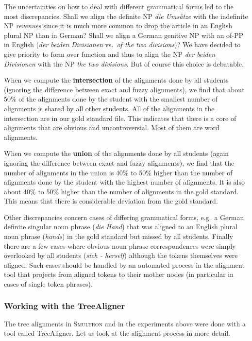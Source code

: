 \documentclass[output=paper]{LSP/langsci}
\begin{document}
The uncertainties on how to deal with different grammatical forms led to the most discrepancies. Shall we align the definite NP \textit{die Umsätze }with the indefinite NP \textit{revenues }since it is much more common to drop the article in an English plural NP than in German? Shall we align a German genitive NP with an of-PP in English (\textit{der beiden }\textit{Divisionen }vs.~\textit{of the two divisions})? We have decided to give priority to form over function and thus to align the NP \textit{der beiden Divisionen }with the NP \textit{the two divisions}. But of course this choice is debatable. 

When we compute the \textbf{intersection }of the alignments done by all students (ignoring the difference between exact and fuzzy alignments), we find that about 50\% of the alignments done by the student with the smallest number of alignments is shared by all other students. All of the alignments in the intersection are in our gold standard file. This indicates that there is a core of alignments that are obvious and uncontroversial. Most of them are word alignments. 

When we compute the \textbf{union }of the alignments done by all students (again ignoring the difference between exact and fuzzy alignments), we find that the number of alignments in the union is 40\% to 50\% higher than the number of alignments done by the student with the highest number of alignments. It is also about 40\% to 50\% higher than the number of alignments in the gold standard. This means that there is considerable deviation from the gold standard. 

Other discrepancies concern cases of differing grammatical forms, e.g.~a German definite singular noun phrase (\textit{die Hand}) that was aligned to an English plural noun phrase (\textit{hands}) in the gold standard but missed by all students. Finally there are a few cases where obvious noun phrase correspondences were simply overlooked by all students (\textit{sich - herself}) although the tokens themselves were aligned. Such cases should be handled by an automated process in the alignment tool that projects from aligned tokens to their mother nodes (in particular in cases of single token phrases). 

\subsubsection{Working with the TreeAligner}\label{sec:volk:2.2.5}

The tree alignments in S\textsc{multron} and in the experiments above were done with a tool called TreeAligner. Let us look at the alignment process in more detail. 
\end{document}
